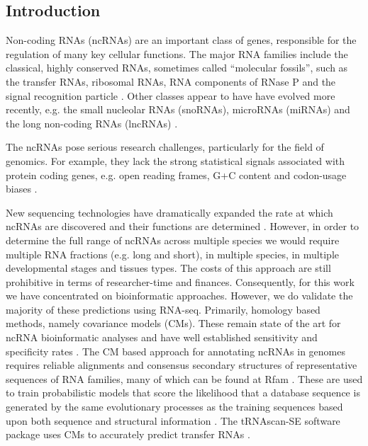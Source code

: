 \documentclass[10pt]{bmc_article}
\newenvironment{bmcformat}{\begin{raggedright}\baselineskip20pt\sloppy\setboolean{publ}{false}}{\end{raggedright}\baselineskip20pt\sloppy}
\begin{document}
\begin{bmcformat}

\section*{Introduction}

Non-coding RNAs (ncRNAs) are an important class of genes, responsible
for the regulation of many key cellular functions. The major RNA
families include the classical, highly conserved RNAs, sometimes
called ``molecular fossils'', such as the transfer RNAs, ribosomal
RNAs, RNA components of RNase P and the signal recognition particle
\cite{Jeffares:1998}. Other classes appear to have have evolved more
recently, e.g. the small nucleolar RNAs (snoRNAs), microRNAs (miRNAs)
and the long non-coding RNAs (lncRNAs) \cite{Hoeppner:2012}.


The ncRNAs pose serious research challenges, particularly for the
field of genomics. For example, they lack the strong statistical
signals associated with protein coding genes, e.g. open reading
frames, G+C content and codon-usage biases \cite{Rivas:2000}. 

New sequencing technologies have dramatically expanded the rate at
which ncRNAs are discovered and their functions are determined
\cite{cech2014noncoding}. However, in order to determine the full
range of ncRNAs across multiple species we would require multiple RNA
fractions (e.g. long and short), in multiple species, in multiple
developmental stages and tissues types. The costs of this approach are
still prohibitive in terms of researcher-time and
finances. Consequently, for this work we have concentrated on
bioinformatic approaches. However, we do validate the majority of
these predictions using RNA-seq. Primarily, homology based methods,
namely covariance models (CMs). These remain state of the art for
ncRNA bioinformatic analyses
\cite{Sakakibara:1994,Eddy:1994,Nawrocki:2009} and have well
established sensitivity and specificity rates \cite{Freyhult:2007}.
The CM based approach for annotating ncRNAs in genomes requires
reliable alignments and consensus secondary structures of
representative sequences of RNA families, many of which can be found
at Rfam
\cite{Griffiths-Jones:2003,Griffiths-Jones:2005,Gardner:2009,Gardner:2011a,Burge:2013}. These
are used to train probabilistic models that score the likelihood that
a database sequence is generated by the same evolutionary processes as
the training sequences based upon both sequence and structural
information \cite{Sakakibara:1994,Eddy:1994,Nawrocki:2009}.  The
tRNAscan-SE software package uses CMs to accurately predict transfer
RNAs \cite{Lowe:1997,Chan:2009}.


\end{bmcformat}
\end{document}
